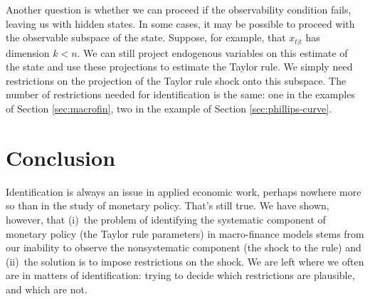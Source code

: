 \documentclass[11pt]{article}
\begin{document}
{Another question is whether we can proceed if the observability condition fails,
leaving us with hidden states.
In some cases, it may be possible to proceed with the observable subspace of the state.
Suppose, for example, that $x_{t|t}$ has dimension $k < n$.
We can still project endogenous variables on this estimate of the state
and use these projections to estimate the Taylor rule.
We simply need restrictions on the projection of the Taylor rule shock
onto this subspace.
The number of restrictions needed for identification is the same:
one in the examples of Section \ref{sec:macrofin}, two in the example of Section \ref{sec:phillips-curve}.

\begin{comment}
\begin{itemize}
\item Bernanke and Blinder (1992, p 902):
``Two types of identifying assumptions are most obvious.
[The first] means assuming that there is no feedback from the economy
to policy actions within the period. ...
[The second] is to suppose ... that policy actions affect real variables
only with a lag.''

\item Bernanke and Mihov (1998, p 874):
``[I]t is sufficient to assume that policy shocks do not affect
the given macro variables within the current period.''

\item Sims (1998, p 933):
``A reasonable picture of the effects of monetary policy shifts
emerges only under the identifying assumptions of delay in the reaction
of certain `sluggish' private sector variables to monetary policy shifts.''
\end{itemize}

These are zeros in the dependence of some variables on the state
(the current and lagged values of all the variables in the system),
so they fit into our framework.
But some concern the policy shock, others concern the behavior
of other variables.

\end{comment}



\section{Conclusion}

Identification is always an issue in applied economic work,
perhaps nowhere more so than in the study of monetary policy.
That's still true.
We have shown, however, that
(i)~the problem of identifying
the systematic component of monetary policy (the Taylor rule parameters)
in macro-finance models stems from our inability to observe the nonsystematic component
(the shock to the rule)
and (ii)~the solution is to impose restrictions on the shock.
We are left where we often are in matters of identification:
trying to decide which restrictions are plausible,
and which are not.


}
\end{document}
